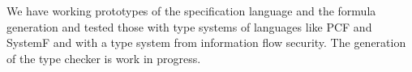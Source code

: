 \documentclass[preprint]{sigplanconf}
\begin{document}
We have working prototypes of the specification language and the
formula generation and tested those with type systems of languages
like PCF and SystemF and with a type system from information flow
security. The generation of the type checker is work in progress.
{} 
\end{document}
